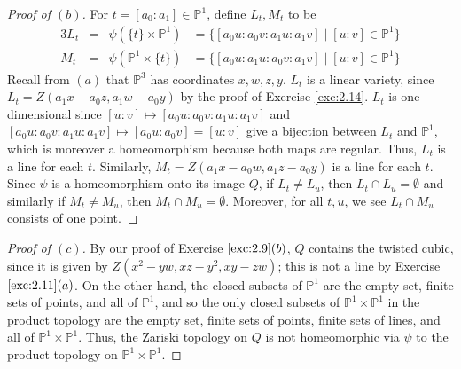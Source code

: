\documentclass[12pt,letterpaper]{article}
\theoremstyle{definition}
\theoremstyle{remark}
\numberwithin{equation}{section}
\numberwithin{figure}{problem}
\newcommand{\PP}{\mathbb{P}}
\begin{document}
\begin{proof}[Proof of $(b)$]
  For $t = [a_0:a_1] \in \PP^1$, define $L_t,M_t$ to be
  \begin{alignat*}{3}
    L_t &={}& \psi(\{t\} \times \PP^1) &= \{[a_0u : a_0v : a_1u : a_1v] \mid [u:v]
    \in \PP^1\}\\
    M_t &={}& \psi(\PP^1 \times \{t\}) &= \{[a_0u : a_1u : a_0v : a_1v] \mid [u:v]
    \in \PP^1\}
  \end{alignat*}
  Recall from $(a)$ that $\PP^3$ has coordinates $x,w,z,y$.
  $L_t$ is a linear variety, since $L_t = Z(a_1x - a_0z,a_1w - a_0y)$ by the
  proof of Exercise \ref{exc:2.14}. $L_t$ is one-dimensional since
  $[u:v] \mapsto [a_0u : a_0v : a_1u : a_1v]$ and 
  $[a_0u : a_0v : a_1u : a_1v] \mapsto [a_0u :a_0v] = [u:v]$ give a
  bijection between $L_t$ and $\PP^1$, which is moreover a homeomorphism because
  both maps are regular. Thus, $L_t$ is a line for each $t$.
  Similarly, $M_t = Z(a_1x - a_0w,a_1z - a_0y)$ is a line for each $t$.
  Since $\psi$ is a homeomorphism onto its image $Q$, if $L_t \ne L_u$, then
  $L_t \cap L_u = \emptyset$ and similarly if $M_t \ne M_u$, then $M_t \cap M_u =
  \emptyset$. Moreover, for all $t,u$, we see $L_t \cap M_u$ consists of one point.
\end{proof}
\begin{proof}[Proof of $(c)$]
  By our proof of Exercise $\ref{exc:2.9}(b)$, $Q$ contains the twisted cubic,
  since it is given by $Z(x^2-yw,xz-y^2,xy-zw)$; this is not a line by Exercise
  $\ref{exc:2.11}(a)$. On the
  other hand, the closed subsets of $\PP^1$ are the empty set, finite sets of
  points, and all of $\PP^1$, and so the only closed subsets of $\PP^1 \times
  \PP^1$ in the product topology are the empty set, finite sets of points,
  finite sets of lines, and all of $\PP^1 \times \PP^1$. Thus, the Zariski
  topology on $Q$ is not homeomorphic via $\psi$ to the product topology on
  $\PP^1 \times \PP^1$.
\end{proof}
\end{document}
